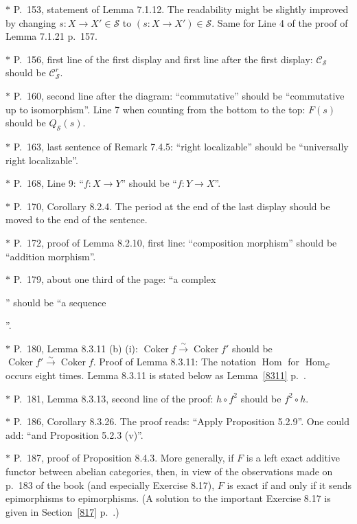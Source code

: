 \documentclass[12pt]{article}
\theoremstyle{remark}
\theoremstyle{definition}
\newcommand{\nn}{\noindent}
\newcommand{\cc}{\mathcal}
\newcommand{\C}{\mathcal C}
\newcommand{\xr}{\xrightarrow}
\DeclareMathOperator{\Coker}{Coker}
\DeclareMathOperator{\Hom}{Hom}
\begin{document}
\nn$*$ P.~153, statement of Lemma 7.1.12. The readability might be slightly improved by changing $s:X\to X'\in\mathcal S$ to $(s:X\to X')\in\mathcal S$. Same for Line 4 of the proof of Lemma 7.1.21 p.~157.

\nn$*$ P.~156, first line of the first display and first line after the first display: $\C_{\cc S}$ should be $\C_{\cc S}^r$.

\nn$*$ P.~160, second line after the diagram: ``commutative'' should be ``commutative up to isomorphism''. Line 7 when counting from the bottom to the top: $F(s)$ should be $Q_{\mathcal S}(s)$.

\nn$*$ P.~163, last sentence of Remark 7.4.5: ``right localizable'' should be ``universally right localizable''.

\nn$*$ P.~168, Line 9: ``$f:X\to Y$'' should be ``$f:Y\to X$''.

\nn$*$ P.~170, Corollary 8.2.4. The period at the end of the last display should be moved to the end of the sentence.

\nn$*$ P.~172, proof of Lemma 8.2.10, first line: ``composition morphism'' should be ``addition morphism''.

\nn$*$ P.~179, about one third of the page: ``a complex 
'' 
should be ``a sequence 
''.

\nn$*$ P.~180, Lemma 8.3.11 (b) (i): $\Coker f\xr\sim\Coker f'$ should be $\Coker f'\xr\sim\Coker f$. Proof of Lemma 8.3.11: The notation $\Hom$ for $\Hom_\C$ occurs eight times. Lemma 8.3.11 is stated below as Lemma~\ref{8311} p.~\pageref{8311}. 

\nn$*$ P.~181, Lemma 8.3.13, second line of the proof: $h\circ f^2$ should be $f^2\circ h$.

\nn$*$ P.~186, Corollary 8.3.26. The proof reads: ``Apply Proposition 5.2.9''. One could add: ``and Proposition 5.2.3 (v)''.

\nn$*$ P.~187, proof of Proposition 8.4.3. More generally, if $F$ is a left exact additive functor between abelian categories, then, in view of the observations made on p.~183 of the book (and especially Exercise 8.17), $F$ is exact if and only if it sends epimorphisms to epimorphisms. (A solution to the important Exercise 8.17 is given in Section~\ref{817} p.~\pageref{817}.)
\end{document}
